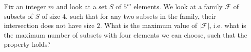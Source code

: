 \begin{problem}
    Fix an integer \( m \) and look at a set \( S \) of \( 5^m \) elements. We look at a family \( \mathcal{F} \) of subsets of \( S \) of size \( 4 \), such that for any two subsets in the family, their intersection does not have size \( 2 \). What is the maximum value of \( |\mathcal{F}| \), i.e. what is the maximum number of subsets with four elements we can choose, such that the property holds?
\end{problem}
